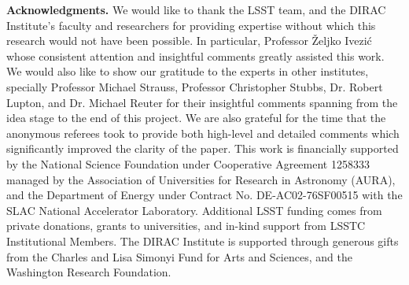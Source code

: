 \documentclass[12pt]{aastex62}
\theoremstyle{definition}
\begin{document}
\acknowledgments
\textbf{Acknowledgments.} We would like to thank the LSST team, and the DIRAC Institute's faculty and researchers for providing expertise without which this research would not have been possible. In particular, Professor \v{Z}eljko Ivezi\'{c} whose consistent attention and insightful comments greatly assisted this work. We would also like to show our gratitude to the experts in other institutes, specially Professor Michael Strauss, Professor Christopher Stubbs, Dr. Robert Lupton, and Dr. Michael Reuter for their insightful comments spanning from the idea stage to the end of this project. We are also grateful for the time that the anonymous referees took to provide both high-level and detailed comments which significantly improved the clarity of the paper. This work is financially supported by the National Science Foundation under Cooperative Agreement 1258333 managed by the Association of Universities for Research in Astronomy (AURA), and the Department of Energy under Contract No. DE-AC02-76SF00515 with the SLAC National Accelerator Laboratory. Additional LSST funding comes from private donations, grants to universities, and in-kind support from LSSTC Institutional Members. The DIRAC Institute is supported through generous gifts from the Charles and Lisa Simonyi Fund for Arts and Sciences, and the Washington Research Foundation.



%
%

\end{document}
